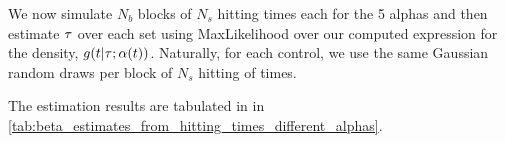 We now simulate $N_b $ blocks of $N_s$ hitting times each for the
5 alphas and then estimate $\tc$ over each set using MaxLikelihood over our
computed expression for the density, $g(t|{ \tau }; \alpha(t) )$. 
Naturally, for each control, we use the same Gaussian random draws per block of
$N_s$ hitting of times.


The estimation results are tabulated in in
\cref{tab:beta_estimates_from_hitting_times_different_alphas}.

\begin{table}
% 
% 
% 
% 
\caption[Batch $\tau$ MLE estimates]
{Results for the estimates arising from simulations using various values of $\a$
(opt, crit, max). In each sub-table there are $N_b$ parameter estimates for each distinct $\a$, with $N_s$ hitting times used to
form a $\tc-$estimate.  The 'true' value of $\tc$ is $\tc=1$. 
Also see \cref{fig:beta_estimates_from_hitting_times_different_alphas}.}
\label{tab:beta_estimates_from_hitting_times_different_alphas} 
\end{table}   

